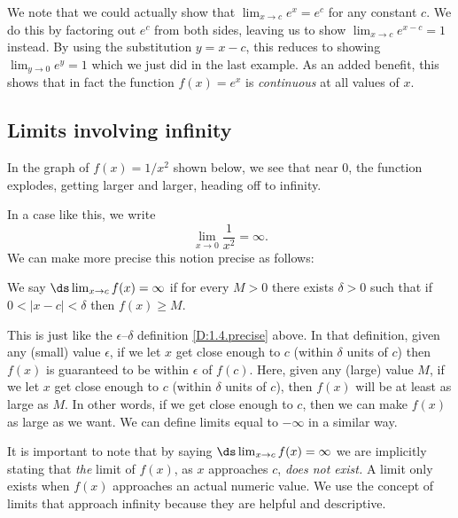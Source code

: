 

We note that we could actually show that $\lim_{x \to c} e^x = e^c $ for any constant $c$.  We do this by factoring out $e^c$ from both sides, leaving us to show $\lim_{x \to c} e^{x-c} = 1 $ instead.  By using the substitution $y=x-c$, this reduces to showing $\lim_{y \to 0} e^y = 1 $ which we just did in the last example.  As an added benefit, this shows that in fact the function $f(x)=e^x$ is \textit{continuous} at all values of $x$.

\subsection*{Limits involving infinity}

In the graph of $f(x)=1/x^2$ shown below, we see that near 0, the function explodes, getting larger and larger, heading off to infinity.


In a case like this, we write
\[ \lim_{x \to 0} \frac1{x^2}=\infty. \]
We can make more precise this notion precise as follows:

{We say $\ds \lim_{x\rightarrow c} f(x)=\infty$ if for every $M>0$ there exists $\delta>0$ such that if $0<|x-c|<\delta$ then $f(x)\geq M$. %
}

This is just like the $\epsilon$--$\delta$ definition \ref{D:1.4.precise} above.  In that definition, given any (small) value $\epsilon$, if we let $x$ get close enough to $c$ (within $\delta$ units of $c$) then $f(x)$ is guaranteed to be within $\epsilon$ of $f(c)$.  Here, given any (large) value $M$, if we let $x$ get close enough to $c$ (within $\delta$ units of $c$), then $f(x)$ will be at least as large as $M$.  In other words, if we get close enough to $c$, then we can make $f(x)$ as large as we want.  We can define limits equal to $-\infty$ in a similar way.

It is important to note that by saying $\ds \lim_{x\to c}f(x) = \infty$ we are implicitly stating that \textit{the} limit of $f(x)$, as $x$ approaches $c$, \textit{does not exist.} A limit only exists when $f(x)$ approaches an actual numeric value. We use the concept of limits that approach infinity because they are helpful and descriptive. 

